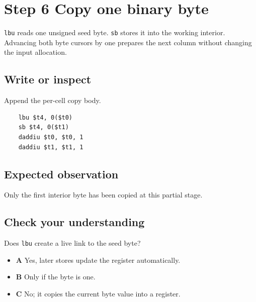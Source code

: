 \section{Step 6 Copy one binary
  byte}\label{008-life-generations-s06-step-6-copy-one-binary-byte}

\texttt{lbu} reads one unsigned seed byte. \texttt{sb} stores it into
the working interior. Advancing both byte cursors by one prepares the
next column without changing the input allocation.

\subsection{Write or
  inspect}\label{008-life-generations-s06-write-or-inspect}

Append the per-cell copy body.

\begin{verbatim}
    lbu $t4, 0($t0)
    sb $t4, 0($t1)
    daddiu $t0, $t0, 1
    daddiu $t1, $t1, 1
\end{verbatim}

\subsection{Expected
  observation}\label{008-life-generations-s06-expected-observation}

Only the first interior byte has been copied at this partial stage.

\subsection{Check your
  understanding}\label{008-life-generations-s06-check-your-understanding}

Does \texttt{lbu} create a live link to the seed byte?

\begin{itemize}
  \tightlist
  \item
        \textbf{A} Yes, later stores update the register automatically.
  \item
        \textbf{B} Only if the byte is one.
  \item
        \textbf{C} No; it copies the current byte value into a register.
\end{itemize}
